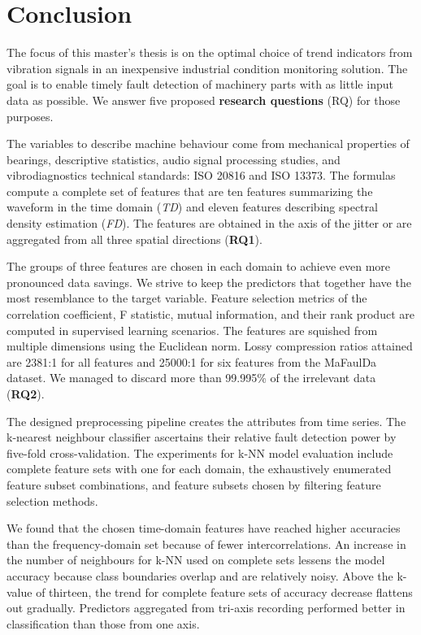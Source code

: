 \chapter{Conclusion} \label{section:conclusion}  
The focus of this master's thesis is on the optimal choice of trend indicators from vibration signals in an inexpensive industrial condition monitoring solution. The goal is to enable timely fault detection of machinery parts with as little input data as possible. We answer five proposed \textbf{research questions} (RQ) for those purposes.

The variables to describe machine behaviour come from mechanical properties of bearings, descriptive statistics, audio signal processing studies, and vibrodiagnostics technical standards: ISO 20816 and ISO 13373. The formulas compute a complete set of features that are ten features summarizing the waveform in the time domain (\emph{TD}) and eleven features describing spectral density estimation (\emph{FD}). The features are obtained in the axis of the jitter or are aggregated from all three spatial directions (\textbf{RQ1}).

The groups of three features are chosen in each domain to achieve even more pronounced data savings. We strive to keep the predictors that together have the most resemblance to the target variable. Feature selection metrics of the correlation coefficient, F statistic, mutual information, and their rank product are computed in supervised learning scenarios. The features are squished from multiple dimensions using the Euclidean norm. Lossy compression ratios attained are 2381:1 for all features and 25000:1 for six features from the MaFaulDa dataset. We managed to discard more than 99.995\% of the irrelevant data (\textbf{RQ2}).

The designed preprocessing pipeline creates the attributes from time series. The k-nearest neighbour classifier ascertains their relative fault detection power by five-fold cross-validation. The experiments for k-NN model evaluation include complete feature sets with one for each domain, the exhaustively enumerated feature subset combinations, and feature subsets chosen by filtering feature selection methods. 

We found that the chosen time-domain features have reached higher accuracies than the frequency-domain set because of fewer intercorrelations. An increase in the number of neighbours for k-NN used on complete sets lessens the model accuracy because class boundaries overlap and are relatively noisy. Above the k-value of thirteen, the trend for complete feature sets of accuracy decrease flattens out gradually. Predictors aggregated from tri-axis recording performed better in classification than those from one axis. 

